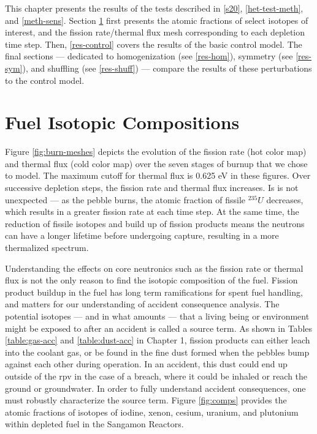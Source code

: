 \label{res}
This chapter presents the results of the tests described in \autoref{s20},  \ref{het-test-meth}, and  \ref{meth-sens}.  Section \ref{res-comps} first presents the atomic fractions of select isotopes of interest, and the fission rate/thermal flux mesh corresponding to each depletion time step.  Then, \autoref{res-control} covers the results of the basic control model. The final sections --- dedicated to homogenization (see \autoref{res-hom}), symmetry (see \autoref{res-sym}), and shuffling (see \autoref{res-shuff}) --- compare the results of these perturbations to the control model.

\section{Fuel Isotopic Compositions}
\label{res-comps}

Figure \ref{fig:burn-meshes} depicts the evolution of the fission rate (hot color map) and thermal flux (cold color map) over the seven stages of burnup that we chose to model.  The maximum cutoff for thermal flux is 0.625 eV in these figures.  Over successive depletion steps, the fission rate and thermal flux increases.  Is is not unexpected --- as the pebble burns, the atomic fraction of fissile $^{235}U$ decreases, which results in a greater fission rate at each time step.  At the same time, the reduction of fissile isotopes and build up of fission products means the neutrons can have a longer lifetime before undergoing capture, resulting in a more thermalized spectrum.



Understanding the effects on core neutronics such as the fission rate or thermal flux is not the only reason to find the isotopic composition of the fuel.  Fission product buildup in the fuel has long term ramifications for spent fuel handling, and matters for our understanding of accident consequence analysis.  The potential isotopes --- and in what amounts --- that a living being or environment might be exposed to after an accident is called a source term.  As shown in Tables \ref{table:gas-acc} and \ref{table:dust-acc} in Chapter 1, fission products can either leach into the coolant gas, or be found in the fine dust formed when the pebbles bump against each other during operation.  In an accident, this dust could end up outside of the \acrshort{rpv} in the case of a breach, where it could be inhaled or reach the ground or groundwater.  In order to fully understand accident consequences, one must robustly characterize the source term.  Figure \ref{fig:comps} provides the atomic fractions of isotopes of iodine, xenon, cesium, uranium, and plutonium within depleted fuel in the Sangamon Reactors.

